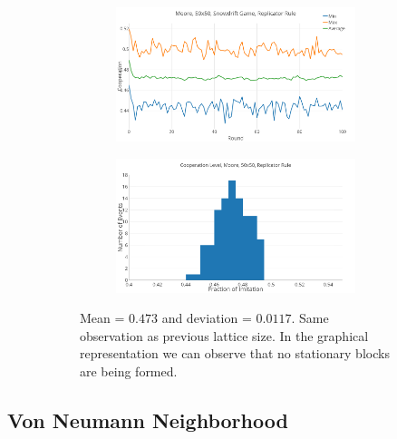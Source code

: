 \documentclass[a4paper, 11pt]{article}
\begin{document}
\begin{figure}[H]
\begin{subfigure}{.55\textwidth}
	\begin{subfigure}{1\textwidth}
		\includegraphics[width=1\linewidth]{SDMoore50x50}
	\end{subfigure}

	\begin{subfigure}{1\textwidth}
		\includegraphics[width=1\linewidth]{SDMoore50x50HG}
	\end{subfigure}
\end{subfigure}%
\begin{subfigure}{.45\textwidth}
	Mean = $0.473$ and deviation = $0.0117$. Same observation as previous lattice size. In the graphical representation we can observe that no stationary blocks are being formed.
\end{subfigure}

\end{figure}




\newpage

\subsection{Von Neumann Neighborhood}
\end{document}
